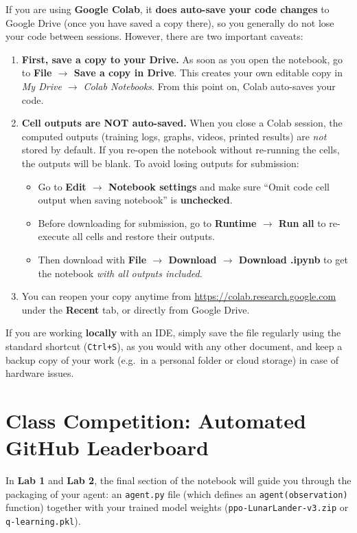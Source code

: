 \documentclass[11pt,a4paper]{article}
\begin{document}
If you are using \textbf{Google Colab}, it \textbf{does auto-save your code changes} to Google Drive (once you have saved a copy there), so you generally do not lose your code between sessions. However, there are two important caveats:

\begin{enumerate}
    \item \textbf{First, save a copy to your Drive.} As soon as you open the notebook, go to \textbf{File $\rightarrow$ Save a copy in Drive}. This creates your own editable copy in \textit{My Drive $\rightarrow$ Colab Notebooks}. From this point on, Colab auto-saves your code.
    \item \textbf{Cell outputs are NOT auto-saved.} When you close a Colab session, the computed outputs (training logs, graphs, videos, printed results) are \textit{not} stored by default. If you re-open the notebook without re-running the cells, the outputs will be blank. To avoid losing outputs for submission:
    \begin{itemize}
        \item Go to \textbf{Edit $\rightarrow$ Notebook settings} and make sure ``Omit code cell output when saving notebook'' is \textbf{unchecked}.
        \item Before downloading for submission, go to \textbf{Runtime $\rightarrow$ Run all} to re-execute all cells and restore their outputs.
        \item Then download with \textbf{File $\rightarrow$ Download $\rightarrow$ Download .ipynb} to get the notebook \textit{with all outputs included}.
    \end{itemize}
    \item You can reopen your copy anytime from \url{https://colab.research.google.com} under the \textbf{Recent} tab, or directly from Google Drive.
\end{enumerate}

If you are working \textbf{locally} with an IDE, simply save the file regularly using the standard shortcut (\texttt{Ctrl+S}), as you would with any other document, and keep a backup copy of your work (e.g.\ in a personal folder or cloud storage) in case of hardware issues.

\section{Class Competition: Automated GitHub Leaderboard}
\label{sec:leaderboard}

In \textbf{Lab 1} and \textbf{Lab 2}, the final section of the notebook will guide you through the packaging of your agent: an \texttt{agent.py} file (which defines an \texttt{agent(observation)} function) together with your trained model weights (\texttt{ppo-LunarLander-v3.zip} or \texttt{q-learning.pkl}).
\end{document}
